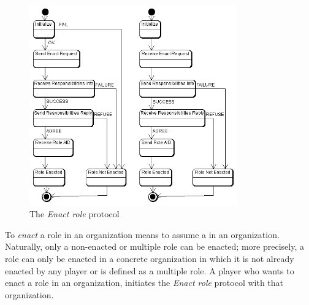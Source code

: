 \begin{figure}[ht]
	\centering
	\includegraphics[width=0.8\textwidth]{images/thespian/enact-role-protocol.png}
	\caption{The \textit{Enact role} protocol}
	\label{figure:thespian-enact-role-protocol}
\end{figure}

To \textit{enact} a role in an organization means to assume a in an organization.
Naturally, only a non-enacted or multiple role can be enacted; more precisely, a role can only be enacted in a concrete organization in which it is not already enacted by any player or is defined as a multiple role.
A player who wants to enact a role in an organization, initiates the \textit{Enact role} protocol with that organization.

